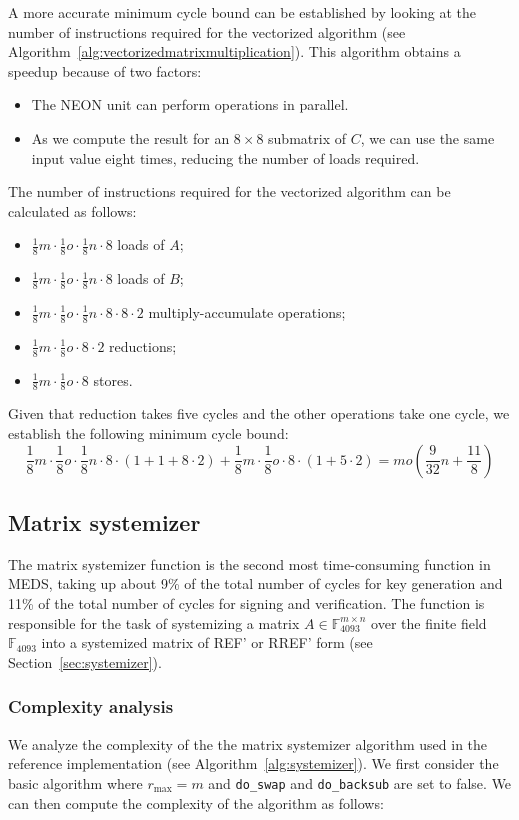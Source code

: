 \documentclass[11pt,a4paper]{report}
\theoremstyle{definition}
\begin{document}
A more accurate minimum cycle bound can be established by looking at the number of instructions required for the vectorized algorithm (see Algorithm~\ref{alg:vectorizedmatrixmultiplication}). This algorithm obtains a speedup because of two factors:
\begin{itemize}
  \item The NEON unit can perform operations in parallel.
  \item As we compute the result for an $8\times8$ submatrix of $C$, we can use the same input value eight times, reducing the number of loads required.
\end{itemize}
The number of instructions required for the vectorized algorithm can be calculated as follows:
\begin{itemize}
  \item $\frac{1}{8}m \cdot \frac{1}{8}o \cdot \frac{1}{8}n \cdot 8$ loads of $A$;
  \item $\frac{1}{8}m \cdot \frac{1}{8}o \cdot \frac{1}{8}n \cdot 8$ loads of $B$;
  \item $\frac{1}{8}m \cdot \frac{1}{8}o \cdot \frac{1}{8}n \cdot 8 \cdot 8 \cdot 2$ multiply-accumulate operations;
  \item $\frac{1}{8}m \cdot \frac{1}{8}o \cdot 8 \cdot 2$ reductions;
  \item $\frac{1}{8}m \cdot \frac{1}{8}o \cdot 8$ stores.
\end{itemize}
Given that reduction takes five cycles and the other operations take one cycle, we establish the following minimum cycle bound:
\[
  \frac{1}{8}m \cdot \frac{1}{8}o \cdot \frac{1}{8}n \cdot 8 \cdot (1 + 1 + 8 \cdot 2) + \frac{1}{8}m \cdot \frac{1}{8}o \cdot 8 \cdot (1 + 5 \cdot 2) = mo\left(\frac{9}{32}n + \frac{11}{8}\right)
\]

\subsection{Matrix systemizer}
\label{sec:matrixsystemizer}
The matrix systemizer function is the second most time-consuming function in MEDS, taking up about 9\% of the total number of cycles for key generation and 11\% of the total number of cycles for signing and verification. The function is responsible for the task of systemizing a matrix $A \in \mathbb{F}_{4093}^{m \times n}$ over the finite field $\mathbb{F}_{4093}$ into a systemized matrix of REF' or RREF' form (see Section~\ref{sec:systemizer}).

\subsubsection{Complexity analysis}
\label{sec:matrixsystemizercomplexity}
We analyze the complexity of the the matrix systemizer algorithm used in the reference implementation (see Algorithm~\ref{alg:systemizer}). We first consider the basic algorithm where $r_\text{max} = m$ and \texttt{do\_swap} and \texttt{do\_backsub} are set to false. We can then compute the complexity of the algorithm as follows:
\end{document}
